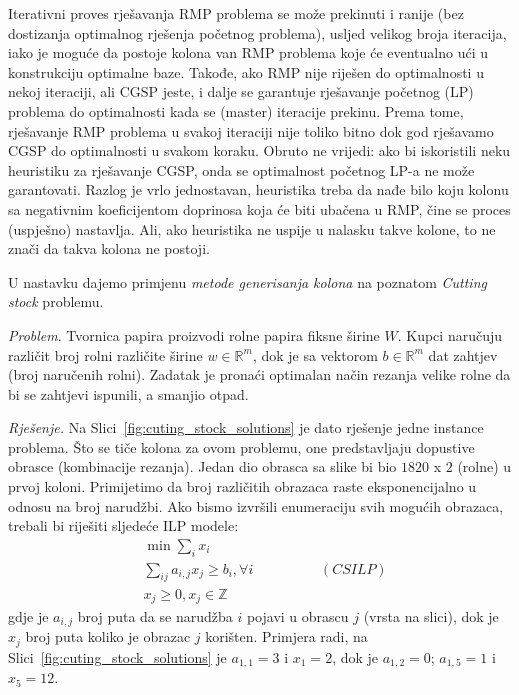 \documentclass[a4paper, utf8, 11pt, colorlinks]{book}
\begin{document}
Iterativni proves rješavanja RMP problema se može prekinuti i ranije (bez dostizanja optimalnog rješenja početnog problema), usljed velikog broja iteracija,  iako je moguće da postoje kolona van RMP problema koje će eventualno ući u konstrukciju optimalne baze.  Takođe, ako RMP nije riješen do optimalnosti u nekoj iteraciji, ali CGSP jeste, i dalje se garantuje rješavanje početnog (LP) problema do optimalnosti kada se (master) iteracije prekinu. Prema tome, rješavanje RMP problema u svakoj iteraciji nije toliko bitno dok god rješavamo CGSP do optimalnosti u svakom koraku. Obruto ne vrijedi:   ako bi iskoristili neku heuristiku za rješavanje CGSP, onda se optimalnost početnog LP-a ne može garantovati. Razlog je vrlo jednostavan, heuristika treba da nađe bilo koju kolonu sa negativnim koeficijentom doprinosa koja će biti ubačena u RMP, čine se proces (uspješno) nastavlja. Ali, ako heuristika ne uspije u nalasku takve kolone, to ne znači da takva kolona ne postoji. 


 U nastavku dajemo primjenu \emph{metode generisanja kolona} na poznatom \emph{Cutting stock} problemu. 
 
 \emph{Problem}. Tvornica papira proizvodi rolne papira fiksne širine  $W$. 
 Kupci naručuju različit broj rolni različite širine $w \in \mathbb{R}^m$, dok je sa vektorom $b \in \mathbb{R}^m$ dat zahtjev (broj naručenih rolni).  Zadatak je pronaći optimalan način  rezanja velike rolne da bi se zahtjevi ispunili, a smanjio otpad.  
 
 \emph{Rješenje.} Na Slici~\ref{fig:cuting_stock_solutions} je dato rješenje jedne instance problema. 
 Što se tiče kolona za ovom problemu, one predstavljaju dopustive obrasce (kombinacije rezanja). Jedan dio obrasca sa slike bi bio $1820$ x $2$ (rolne) u prvoj koloni.
 Primijetimo da broj različitih obrazaca raste eksponencijalno u odnosu na broj narudžbi.  Ako bismo izvršili enumeraciju svih mogućih obrazaca, trebali bi riješiti sljedeće ILP modele:
 \begin{align*}
      & \min \sum_{i} x_i \\
      & \sum_{ij} a_{i,j }x_j \geq b_i, \forall i \hspace{2cm} (CSILP)\\
      &  x_j \geq 0, x_{j} \in \mathbb{Z} 
 \end{align*}
 gdje je $a_{i,j}$ broj puta da se narudžba $i$ pojavi u obrascu $j$ (vrsta na slici), dok  je $x_j$ broj puta koliko je obrazac $j$ korišten. Primjera radi, na  Slici~\ref{fig:cuting_stock_solutions} je $a_{1,1}=3$ i $x_1 = 2$, dok je $a_{1,2}=0$; $a_{1,5}=1$ i $ x_5 = 12$.
 
\end{document}
